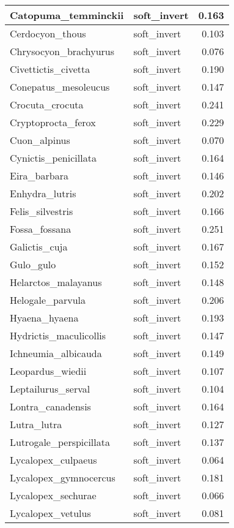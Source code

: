 \begin{table}
\begin{tabular}[t]{l|l|r}
\hline
Catopuma\_temminckii & soft\_invert & 0.163\\
\hline
Cerdocyon\_thous & soft\_invert & 0.103\\
\hline
Chrysocyon\_brachyurus & soft\_invert & 0.076\\
\hline
Civettictis\_civetta & soft\_invert & 0.190\\
\hline
Conepatus\_mesoleucus & soft\_invert & 0.147\\
\hline
Crocuta\_crocuta & soft\_invert & 0.241\\
\hline
Cryptoprocta\_ferox & soft\_invert & 0.229\\
\hline
Cuon\_alpinus & soft\_invert & 0.070\\
\hline
Cynictis\_penicillata & soft\_invert & 0.164\\
\hline
Eira\_barbara & soft\_invert & 0.146\\
\hline
Enhydra\_lutris & soft\_invert & 0.202\\
\hline
Felis\_silvestris & soft\_invert & 0.166\\
\hline
Fossa\_fossana & soft\_invert & 0.251\\
\hline
Galictis\_cuja & soft\_invert & 0.167\\
\hline
Gulo\_gulo & soft\_invert & 0.152\\
\hline
Helarctos\_malayanus & soft\_invert & 0.148\\
\hline
Helogale\_parvula & soft\_invert & 0.206\\
\hline
Hyaena\_hyaena & soft\_invert & 0.193\\
\hline
Hydrictis\_maculicollis & soft\_invert & 0.147\\
\hline
Ichneumia\_albicauda & soft\_invert & 0.149\\
\hline
Leopardus\_wiedii & soft\_invert & 0.107\\
\hline
Leptailurus\_serval & soft\_invert & 0.104\\
\hline
Lontra\_canadensis & soft\_invert & 0.164\\
\hline
Lutra\_lutra & soft\_invert & 0.127\\
\hline
Lutrogale\_perspicillata & soft\_invert & 0.137\\
\hline
Lycalopex\_culpaeus & soft\_invert & 0.064\\
\hline
Lycalopex\_gymnocercus & soft\_invert & 0.181\\
\hline
Lycalopex\_sechurae & soft\_invert & 0.066\\
\hline
Lycalopex\_vetulus & soft\_invert & 0.081\\

\end{tabular}
\end{table}
